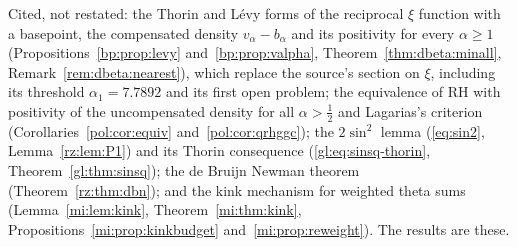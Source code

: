 Cited, not restated: the Thorin and L\'evy forms of the reciprocal $\xi$ function with a basepoint, the compensated density $v_\alpha-b_\alpha$ and its positivity for every $\alpha\ge1$ (Propositions~\ref{bp:prop:levy} and~\ref{bp:prop:valpha}, Theorem~\ref{thm:dbeta:minall}, Remark~\ref{rem:dbeta:nearest}), which replace the source's section on $\xi$, including its threshold $\alpha_1=7.7892$ and its first open problem; the equivalence of RH with positivity of the uncompensated density for all $\alpha>\frac12$ and Lagarias's criterion (Corollaries~\ref{pol:cor:equiv} and~\ref{pol:cor:qrhggc}); the $2\sin^2$ lemma (\eqref{eq:sin2}, Lemma~\ref{rz:lem:P1}) and its Thorin consequence (\eqref{gl:eq:sinsq-thorin}, Theorem~\ref{gl:thm:sinsq}); the de Bruijn Newman theorem (Theorem~\ref{rz:thm:dbn}); and the kink mechanism for weighted theta sums (Lemma~\ref{mi:lem:kink}, Theorem~\ref{mi:thm:kink}, Propositions~\ref{mi:prop:kinkbudget} and~\ref{mi:prop:reweight}). The results are these.
